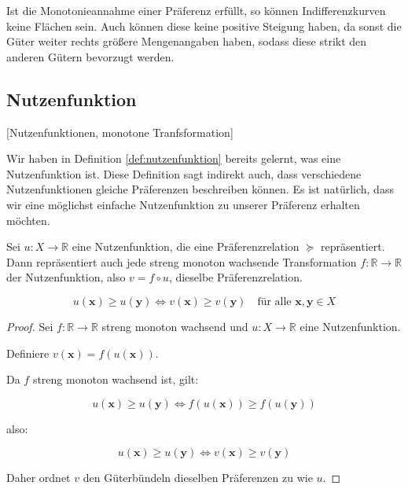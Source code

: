 \begin{remark}
	Ist die Monotonieannahme einer Präferenz erfüllt, so können Indifferenzkurven keine Flächen sein. Auch können diese keine positive Steigung haben, da sonst die Güter weiter rechts größere Mengenangaben haben, sodass diese strikt den anderen Gütern bevorzugt werden.
\end{remark}

\subsection{Nutzenfunktion}

[Nutzenfunktionen, monotone Tranfsformation]

Wir haben in Definition \ref{def:nutzenfunktion} bereits gelernt, was eine Nutzenfunktion ist.
Diese Definition sagt indirekt auch, dass verschiedene Nutzenfunktionen gleiche Präferenzen beschreiben können. Es ist natürlich, dass wir eine möglichst einfache Nutzenfunktion zu unserer Präferenz erhalten möchten.

\begin{theorem} 
	Sei \( u: X \to \mathbb{R} \) eine Nutzenfunktion, die eine Präferenzrelation \( \succeq \) repräsentiert. Dann repräsentiert auch jede streng monoton wachsende Transformation \( f: \mathbb{R} \to \mathbb{R} \) der Nutzenfunktion, also \( v = f \circ u \), dieselbe Präferenzrelation.

	\[
		u(\mathbf{x}) \geq u(\mathbf{y}) \iff v(\mathbf{x}) \geq v(\mathbf{y}) \quad \text{für alle } \mathbf{x}, \mathbf{y} \in X
	\]
\end{theorem}

\begin{proof}
	Sei \( f: \mathbb{R} \rightarrow \mathbb{R} \) streng monoton wachsend und \( u: X \rightarrow \mathbb{R} \) eine Nutzenfunktion.

	Definiere \( v(\mathbf{x}) = f(u(\mathbf{x})) \).

	Da \( f \) streng monoton wachsend ist, gilt:

	\[
		u(\mathbf{x}) \geq u(\mathbf{y}) \iff f(u(\mathbf{x})) \geq f(u(\mathbf{y}))
	\]

	also:

	\[
		u(\mathbf{x}) \geq u(\mathbf{y}) \iff v(\mathbf{x}) \geq v(\mathbf{y})
	\]

	Daher ordnet \( v \) den Güterbündeln dieselben Präferenzen zu wie \( u \).
\end{proof}


